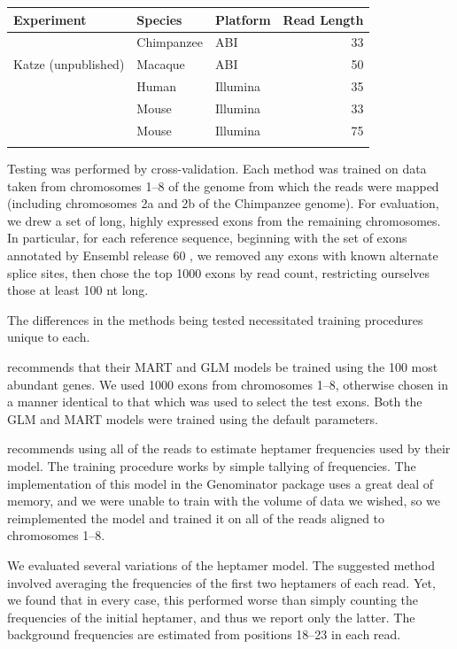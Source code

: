 \documentclass{bioinfo}
\begin{document}
\begin{table}
{
\begin{tabular}{lllr}\toprule
Experiment & Species & Platform & Read Length \\\midrule
\citet{Wetterbom2010} & Chimpanzee & ABI & 33 \\
Katze (unpublished) & Macaque & ABI & 50 \\
\citet{Bullard2010} & Human & Illumina & 35 \\
\citet{Mortazavi2008} & Mouse & Illumina & 33 \\
\citet{Trapnell2010} & Mouse & Illumina & 75 \\\botrule
\end{tabular}
}{}
\end{table}


Testing was performed by cross-validation. Each method was trained on data taken
from chromosomes 1--8 of the genome from which the reads were mapped (including
chromosomes 2a and 2b of the Chimpanzee genome). For evaluation, we drew a set
of long, highly expressed exons from the remaining chromosomes. In particular, for
each reference sequence, beginning with the set of exons annotated by Ensembl
release 60 \cite{Hubbard2009}, we removed any exons with known alternate splice
sites, then chose the top 1000 exons by read count, restricting ourselves those
at least 100 nt long.

The differences in the methods being tested necessitated training procedures
unique to each.

\citet{Li2010} recommends that their MART and GLM models be trained using the
100 most abundant genes. We used 1000 exons from chromosomes 1--8, otherwise
chosen in a manner identical to that which was used to select the test exons.
Both the GLM and MART models were trained using the default parameters.

\citet{Hansen2010} recommends using all of the reads to estimate heptamer
frequencies used by their model. The training procedure works by simple tallying
of frequencies. The implementation of this model in the Genominator package
uses a great deal of memory, and we were unable to train with the volume of
data we wished, so we reimplemented the model and trained it on all of the reads
aligned to chromosomes 1--8.

We evaluated several variations of the heptamer model. The suggested method
involved averaging the frequencies of the first two heptamers of each read. Yet,
we found that in every case, this performed worse than simply counting the
frequencies of the initial heptamer, and thus we report only the latter. The
background frequencies are estimated from positions 18--23 in each read.
\end{document}
